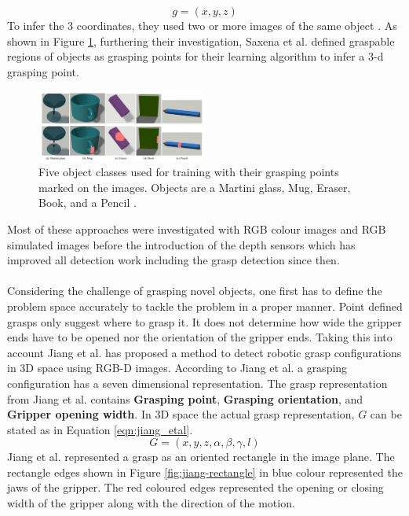 \documentclass{vldb}
\begin{document}
\begin{equation}
    g = (x,y,z)
\end{equation}
To infer the 3 coordinates, they used two or more images of the same object \cite{saxena_2006}. As shown in Figure \ref{fig:saxena-regions}, furthering their investigation, Saxena et al. \cite{saxena-2008} defined graspable regions of objects as grasping points for their learning algorithm to infer a 3-d grasping point.
\begin{figure}[!h]
    \centering
    \includegraphics[width=0.5\textwidth]{Saxena_2008_graspingRegions}
    \caption{Five object classes used for training with their grasping points marked on the images. Objects are a Martini glass, Mug, Eraser, Book, and a Pencil \protect\cite{saxena-2008}.}
    \label{fig:saxena-regions}
\end{figure}
Most of these approaches were investigated with RGB colour images and RGB simulated images before the introduction of the depth sensors which has improved all detection work including the grasp detection since then.
\\ \\
Considering the challenge of grasping novel objects, one first has to define the problem space accurately to tackle the problem in a proper manner. Point defined grasps only suggest where to grasp it. It does not determine how wide the gripper ends have to be opened nor the orientation of the gripper ends. Taking this into account Jiang et al. \cite{jiang} has proposed a method to detect robotic grasp configurations in 3D space using RGB-D images. According to Jiang et al. \cite{jiang} a grasping configuration has a seven dimensional representation. The grasp representation from Jiang et al. \cite{jiang} contains \textbf{Grasping point}, \textbf{Grasping orientation}, and \textbf{Gripper opening width}. In 3D space the actual grasp representation, $G$ can be stated as in Equation \ref{eqn:jiang_etal}.
\begin{equation}
\label{eqn:jiang_etal}
G = (x, y, z, \alpha, \beta, \gamma, l)
\end{equation}
Jiang et al. \cite{jiang} represented a grasp as an oriented rectangle in the image plane. The rectangle edges shown in Figure \ref{fig:jiang-rectangle} in blue colour represented the jaws of the gripper. The red coloured edges represented the opening or closing width of the gripper along with the direction of the motion. 
\end{document}
